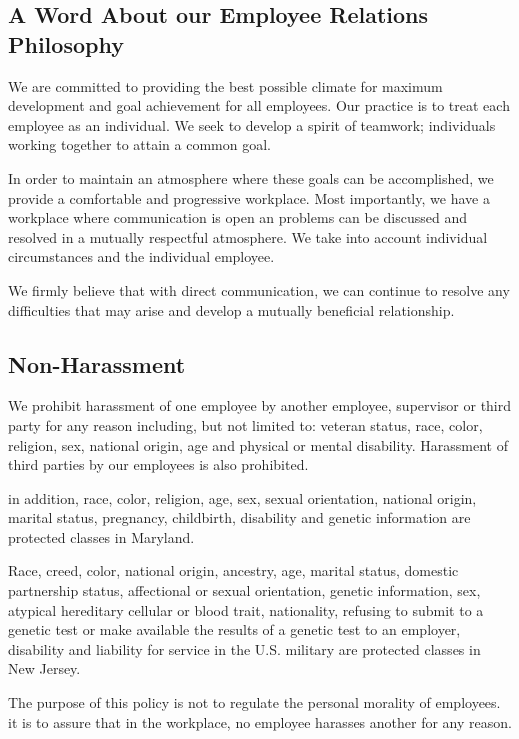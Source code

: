 \subsection{A Word About our Employee Relations Philosophy}

We are committed to providing the best possible climate for maximum development and goal achievement for all employees. Our practice is to treat each employee as an individual. We seek to develop a spirit of teamwork; individuals working together to attain a common goal.

In order to maintain an atmosphere where these goals can be accomplished, we provide a comfortable and progressive workplace. Most importantly, we have a workplace where communication is open an problems can be discussed and resolved in a mutually respectful atmosphere. We take into account individual circumstances and the individual employee.

We firmly believe that with direct communication, we can continue to resolve any difficulties that may arise and develop a mutually beneficial relationship.

\subsection{Non-Harassment}

We prohibit harassment of one employee by another employee, supervisor or third party for any reason including, but not limited to: veteran status, race, color, religion, sex, national origin, age and physical or mental disability. Harassment of third parties by our employees is also prohibited.

in addition, race, color, religion, age, sex, sexual orientation, national origin, marital status, pregnancy, childbirth, disability and genetic information are protected classes in Maryland.

Race, creed, color, national origin, ancestry, age, marital status, domestic partnership status, affectional or sexual orientation, genetic information, sex, atypical hereditary cellular or blood trait, nationality, refusing to submit to a genetic test or make available the results of a genetic test to an employer, disability and liability for service in the U.S. military are protected classes in New Jersey.

The purpose of this policy is not to regulate the personal morality of employees. it is to assure that in the workplace, no employee harasses another for any reason.

